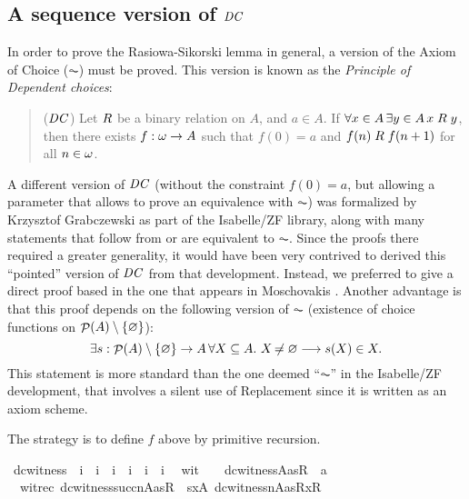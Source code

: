 \subsection{A sequence version of $\mathit{DC}$}\label{sec:sequence-version-dc}
In order to prove the Rasiowa-Sikorski lemma in
general, a version of the Axiom of Choice ($\AC$) must be proved. This
version is known as the \emph{Principle of Dependent choices}:
\begin{quote}
  ($\mathit{DC}$) Let $\mathrel{R}$ be a binary relation on $A$, and $a\in A$. If
  $\forall x\in A\,  \exists y\in A\, x\mathrel{R} y$, then there exists
  $f:\omega\to A$ such that $f(0)=a$ and $f(n)\mathrel{R} f(n+1)$ for all
  $n\in\omega$.
\end{quote}

A different version of $\mathit{DC}$ (without the constraint $f(0)=a$, but
allowing a parameter that allows to prove an equivalence with $\AC$) was
formalized by Krzysztof Grabczewski as part of the Isabelle/ZF
library, along with many 
statements that follow from or are equivalent to $\AC$. Since the
proofs there required a greater generality, it would have been very
contrived to derived this ``pointed'' version of $\mathit{DC}$ from that
development. Instead, we preferred to give a direct proof based in the
one that appears in Moschovakis \cite{moschovakis1994notes}. Another
advantage is that this proof depends on the following version of $\AC$
(existence of choice functions on $\mathop{\mathcal{P}}(A)\setminus \{\varnothing\}$):
\[
\exists s: \mathop{\mathcal{P}}(A)\setminus \{\varnothing\}\to A \, \forall X\subseteq A.\ X\not\nobreak\mkern -2mu = \varnothing \longrightarrow
s(X) \in X.
\]
This statement is more standard than the one deemed ``$\AC$'' in the
Isabelle/ZF development, that involves a silent use of Replacement
since it is written as an axiom scheme. 

The strategy is to define $f$ above by primitive recursion. 

\begin{isabelle}\isamarkuptrue%
\isamarkupfalse%
\ dc{\isacharunderscore}witness\ {\isacharcolon}{\isacharcolon}\ {\isachardoublequoteopen}i\ {\isasymRightarrow}\ i\ {\isasymRightarrow}\ i\ {\isasymRightarrow}\ i\ {\isasymRightarrow}\ i\ {\isasymRightarrow}\ i{\isachardoublequoteclose}\isanewline
{}\isamarkupfalse%
\isanewline
\ \ wit{}\ \ \ {\isacharcolon}\ {\isachardoublequoteopen}dc{\isacharunderscore}witness{\isacharparenleft}{}{\isacharcomma}A{\isacharcomma}a{\isacharcomma}s{\isacharcomma}R{\isacharparenright}\ {\isacharequal}\ a{\isachardoublequoteclose}\isanewline
\ \ witrec\ {\isacharcolon}{\isachardoublequoteopen}dc{\isacharunderscore}witness{\isacharparenleft}succ{\isacharparenleft}n{\isacharparenright}{\isacharcomma}A{\isacharcomma}a{\isacharcomma}s{\isacharcomma}R{\isacharparenright}\ {\isacharequal}\ s{\isacharbackquote}{\isacharbraceleft}x{\isasymin}A{\isachardot}\ {\isasymlangle}dc{\isacharunderscore}witness{\isacharparenleft}n{\isacharcomma}A{\isacharcomma}a{\isacharcomma}s{\isacharcomma}R{\isacharparenright}{\isacharcomma}x{\isasymrangle}{\isasymin}R\ {\isacharbraceright}{\isachardoublequoteclose}
\end{isabelle}

